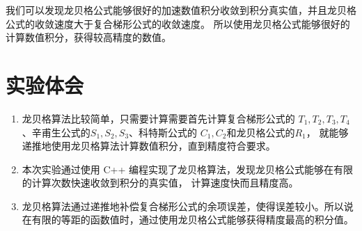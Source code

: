 \documentclass[lang=cn,11pt,a4paper]{elegantpaper}
\begin{document}
我们可以发现龙贝格公式能够很好的加速数值积分收敛到积分真实值，并且龙贝格公式的收敛速度大于复合梯形公式的收敛速度。
所以使用龙贝格公式能够很好的计算数值积分，获得较高精度的数值。


\section{实验体会}
\begin{enumerate}
  \item 龙贝格算法比较简单，只需要计算需要首先计算复合梯形公式的 $T_1, T_2, T_3, T_4$、辛甫生公式的$S_1, S_2, S_3$、科特斯公式的 $C_1, C_2$和龙贝格公式的$R_1$，
  就能够递推地使用龙贝格算法计算数值积分，直到精度符合要求。
  \item 本次实验通过使用 C++ 编程实现了龙贝格算法，发现龙贝格公式能够在有限的计算次数快速收敛到积分的真实值，
  计算速度快而且精度高。
  \item 龙贝格算法通过递推地补偿复合梯形公式的余项误差，使得误差较小。所以说在有限的等距的函数值时，通过使用龙贝格公式能够获得精度最高的积分值。
\end{enumerate}
\end{document}
